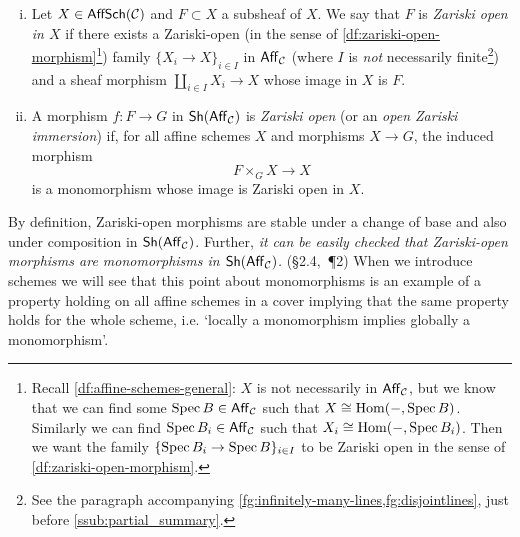         \begin{definition}\label{df:zariski-open-sheaves}
            \mbox{}\vspace{-1em}
            \begin{enumerate}[(i)]
                \item Let $X\in\mathsf{AffSch}(\mathcal{C})$ and $F\subset X$ a subsheaf of $X$.
                    We say that $F$ is \emph{Zariski open in $X$} if there exists a Zariski-open (in the sense of \cref{df:zariski-open-morphism}\footnote{
                        Recall \cref{df:affine-schemes-general}: $X$ is not necessarily in $\mathsf{Aff}_{\mathcal{C}}$, but we know that we can find some $\operatorname{Spec} B\in\mathsf{Aff}_{\mathcal{C}}$ such that $X\cong\operatorname{Hom}({-},\operatorname{Spec} B)$.
                        Similarly we can find $\operatorname{Spec} B_i\in\mathsf{Aff}_{\mathcal{C}}$ such that $X_i\cong\operatorname{Hom}({-},\operatorname{Spec} B_i)$.
                        Then we want the family $\{\operatorname{Spec} B_i\to\operatorname{Spec} B\}_{i\in I}$ to be Zariski open in the sense of \cref{df:zariski-open-morphism}.
                    }) family $\{X_i\to X\}_{i\in I}$ in $\mathsf{Aff}_{\mathcal{C}}$ (where $I$ is \emph{not} necessarily finite\footnote{
                        See the paragraph accompanying \cref{fg:infinitely-many-lines,fg:disjointlines}, just before \cref{ssub:partial_summary}.
                    }) and a sheaf morphism $\coprod_{i\in I}X_i\to X$ whose image in $X$ is $F$.
                \item A morphism $f\colon F\to G$ in $\mathsf{Sh}(\mathsf{Aff}_{\mathcal{C}})$ is \emph{Zariski open} (or an \emph{open Zariski immersion}) if, for all affine schemes $X$ and morphisms $X\to G$, the induced morphism
                \begin{equation*}
                    F\times_G X\to X
                \end{equation*}
                is a monomorphism whose image is Zariski open in $X$.\qedhere
            \end{enumerate}
        \end{definition}

        By definition, Zariski-open morphisms are stable under a change of base and also under composition in $\mathsf{Sh}(\mathsf{Aff}_{\mathcal{C}})$.
        Further, \emph{it can be easily checked that Zariski-open morphisms are monomorphisms in $\mathsf{Sh}(\mathsf{Aff}_{\mathcal{C}})$.} (\S2.4,~\P2)
        When we introduce schemes we will see that this point about monomorphisms is an example of a property holding on all affine schemes in a cover implying that the same property holds for the whole scheme, i.e. `locally a monomorphism implies globally a monomorphism'.

